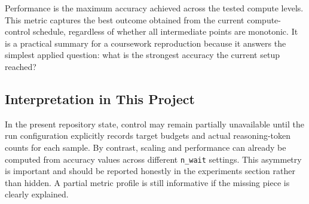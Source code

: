Performance is the maximum accuracy achieved across the tested compute levels. This metric captures the best outcome obtained from the current compute-control schedule, regardless of whether all intermediate points are monotonic. It is a practical summary for a coursework reproduction because it answers the simplest applied question: what is the strongest accuracy the current setup reached?

\subsection{Interpretation in This Project}

In the present repository state, control may remain partially unavailable until the run configuration explicitly records target budgets and actual reasoning-token counts for each sample. By contrast, scaling and performance can already be computed from accuracy values across different \texttt{n\_wait} settings. This asymmetry is important and should be reported honestly in the experiments section rather than hidden. A partial metric profile is still informative if the missing piece is clearly explained.
